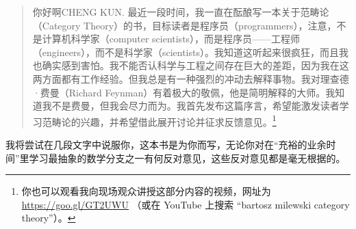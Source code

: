 \usepackage{listings}\begin{quote}
  你好啊CHENG KUN.
  最近一段时间，我一直在酝酿写一本关于范畴论（Category Theory）的书，目标读者是程序员（programmers），注意，不是计算机科学家（computer scientists），而是程序员——工程师（engineers），而不是科学家（scientists）。我知道这听起来很疯狂，而且我也确实感到害怕。我不能否认科学与工程之间存在巨大的差距，因为我在这两方面都有工作经验。但我总是有一种强烈的冲动去解释事物。我对理查德·费曼（Richard Feynman）有着极大的敬佩，他是简明解释的大师。我知道我不是费曼，但我会尽力而为。我首先发布这篇序言，希望能激发读者学习范畴论的兴趣，并希望借此展开讨论并征求反馈意见。\footnote{
    你也可以观看我向现场观众讲授这部分内容的视频，网址为 \href{https://goo.gl/GT2UWU}{https://goo.gl/GT2UWU} （或在 YouTube 上搜索 “bartosz milewski category theory”）。}
\end{quote}


%
%
%

%
%
%
%
%

\lettrine[lhang=0.17]{我}{将尝试}在几段文字中说服你，这本书是为你而写，无论你对在“充裕的业余时间”里学习最抽象的数学分支之一有何反对意见，这些反对意见都是毫无根据的。


